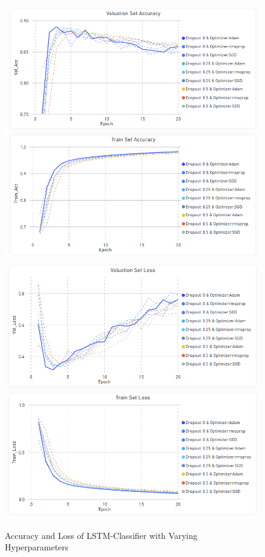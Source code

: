 \documentclass[11pt, a4paper]{article}
\begin{document}
\begin{figure}[!h]
    \centering
    \includegraphics[scale=0.43]{LSTM_Accuracy.png}
    \includegraphics[scale=0.43]{LSTM_Loss.png}
    \caption{Accuracy and Loss of LSTM-Classifier with Varying Hyperparameters}
    \label{fig:lstm_acc_loss}
\end{figure}
\end{document}
